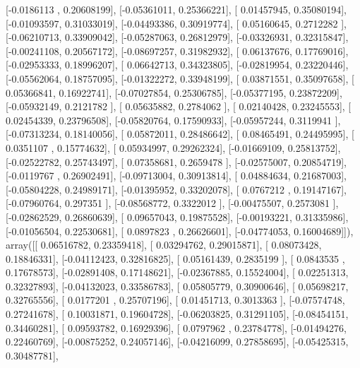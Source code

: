 \documentclass{article}
\begin{document}
       [-0.0186113 ,  0.20608199],
       [-0.05361011,  0.25366221],
       [ 0.01457945,  0.35080194],
       [-0.01093597,  0.31033019],
       [-0.04493386,  0.30919774],
       [ 0.05160645,  0.2712282 ],
       [-0.06210713,  0.33909042],
       [-0.05287063,  0.26812979],
       [-0.03326931,  0.32315847],
       [-0.00241108,  0.20567172],
       [-0.08697257,  0.31982932],
       [ 0.06137676,  0.17769016],
       [-0.02953333,  0.18996207],
       [ 0.06642713,  0.34323805],
       [-0.02819954,  0.23220446],
       [-0.05562064,  0.18757095],
       [-0.01322272,  0.33948199],
       [ 0.03871551,  0.35097658],
       [ 0.05366841,  0.16922741],
       [-0.07027854,  0.25306785],
       [-0.05377195,  0.23872209],
       [-0.05932149,  0.2121782 ],
       [ 0.05635882,  0.2784062 ],
       [ 0.02140428,  0.23245553],
       [ 0.02454339,  0.23796508],
       [-0.05820764,  0.17590933],
       [-0.05957244,  0.3119941 ],
       [-0.07313234,  0.18140056],
       [ 0.05872011,  0.28486642],
       [ 0.08465491,  0.24495995],
       [ 0.0351107 ,  0.15774632],
       [ 0.05934997,  0.29262324],
       [-0.01669109,  0.25813752],
       [-0.02522782,  0.25743497],
       [ 0.07358681,  0.2659478 ],
       [-0.02575007,  0.20854719],
       [-0.0119767 ,  0.26902491],
       [-0.09713004,  0.30913814],
       [ 0.04884634,  0.21687003],
       [-0.05804228,  0.24989171],
       [-0.01395952,  0.33202078],
       [ 0.0767212 ,  0.19147167],
       [-0.07960764,  0.297351  ],
       [-0.08568772,  0.3322012 ],
       [-0.00475507,  0.2573081 ],
       [-0.02862529,  0.26860639],
       [ 0.09657043,  0.19875528],
       [-0.00193221,  0.31335986],
       [-0.01056504,  0.22530681],
       [ 0.0897823 ,  0.26626601],
       [-0.04774053,  0.16004689]]), array([[ 0.06516782,  0.23359418],
       [ 0.03294762,  0.29015871],
       [ 0.08073428,  0.18846331],
       [-0.04112423,  0.32816825],
       [ 0.05161439,  0.2835199 ],
       [ 0.0843535 ,  0.17678573],
       [-0.02891408,  0.17148621],
       [-0.02367885,  0.15524004],
       [ 0.02251313,  0.32327893],
       [-0.04132023,  0.33586783],
       [ 0.05805779,  0.30900646],
       [ 0.05698217,  0.32765556],
       [ 0.0177201 ,  0.25707196],
       [ 0.01451713,  0.3013363 ],
       [-0.07574748,  0.27241678],
       [ 0.10031871,  0.19604728],
       [-0.06203825,  0.31291105],
       [-0.08454151,  0.34460281],
       [ 0.09593782,  0.16929396],
       [ 0.0797962 ,  0.23784778],
       [-0.01494276,  0.22460769],
       [-0.00875252,  0.24057146],
       [-0.04216099,  0.27858695],
       [-0.05425315,  0.30487781],
\end{document}
